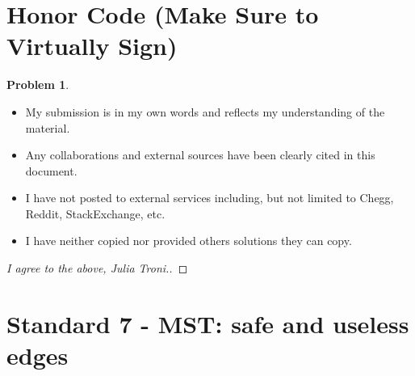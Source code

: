 \documentclass[11pt]{article}
\theoremstyle{definition}
\theoremstyle{definition}
\newtheorem{required}{Problem}
\theoremstyle{definition}
\begin{document}
\section{Honor Code (Make Sure to Virtually Sign)} \label{HonorCode}

\begin{required}
\begin{itemize}
\item My submission is in my own words and reflects my understanding of the material.
\item Any collaborations and external sources have been clearly cited in this document.
\item I have not posted to external services including, but not limited to Chegg, Reddit, StackExchange, etc.
\item I have neither copied nor provided others solutions they can copy.
\end{itemize}

\end{required}

\begin{proof}[I agree to the above, Julia Troni.]
\end{proof}



\newpage
\section{Standard 7 - MST: safe and useless edges}
\end{document}
